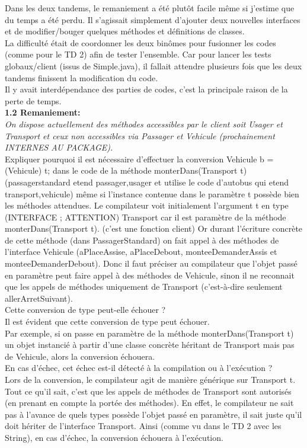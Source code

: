 \documentclass{article}
\begin{document}
Dans les deux tandems, le remaniement a été plutôt facile même si j'estime que du temps a
été perdu. Il s’agissait simplement d’ajouter deux nouvelles interfaces et de modifier/bouger quelques méthodes et définitions de classes.\\

La difficulté était de coordonner les deux binômes pour fusionner les codes (comme pour le TD 2) afin de tester l’ensemble. Car pour lancer les tests globaux/client (issus de
Simple.java), il fallait attendre plusieurs fois que les deux tandems finissent la modification du code.\\

Il y avait interdépendance des parties de codes, c’est la principale raison de la perte de temps.\\

\textbf{1.2 Remaniement:}\\
\textit{On dispose actuellement des méthodes accessibles par le client soit Usager et Transport et ceux non accessibles via Passager et Vehicule (prochainement INTERNES AU PACKAGE).}\\

Expliquer pourquoi il est nécessaire d’effectuer la conversion Vehicule b = (Vehicule) t;
dans le code de la méthode monterDans(Transport t) (passagerstandard etend passager,usager et utilise le code d'autobus qui etend transport,vehicule) même si l’instance contenue dans le paramètre t possède bien les méthodes attendues. Le compilateur voit initialement l’argument t en type (INTERFACE ; ATTENTION) Transport car il est paramètre de la méthode monterDans(Transport t). (c'est une fonction client)
Or durant l’écriture concrète de cette méthode (dans PassagerStandard) on fait appel à des méthodes de l’interface Vehicule (aPlaceAssise, aPlaceDebout, monteeDemanderAssis et
monteeDemanderDebout). Donc il faut préciser au compilateur que l’objet passé en paramètre peut faire appel à des méthodes de Vehicule, sinon il ne reconnait que les appels de méthodes uniquement de Transport (c’est-à-dire seulement allerArretSuivant).\\

Cette conversion de type peut-elle échouer ?\\
Il est évident que cette conversion de type peut échouer.\\
Par exemple, si on passe en paramètre de la méthode monterDans(Transport t) un objet
instancié à partir d’une classe concrète héritant de Transport mais pas de Vehicule, alors la conversion échouera.\\
En cas d’échec, cet échec est-il détecté à la compilation ou à l’exécution ?\\
Lors de la conversion, le compilateur agit de manière générique sur Transport t. Tout ce
qu’il sait, c’est que les appels de méthodes de Transport sont autorisés (en prenant en
compte la portée des méthodes). En effet, le compilateur ne sait pas à l’avance de quels types possède l’objet passé en paramètre, il sait juste qu’il doit hériter de l’interface Transport. Ainsi (comme vu dans le TD 2 avec les String), en cas d’échec, la conversion échouera à l’exécution.\\
\end{document}
